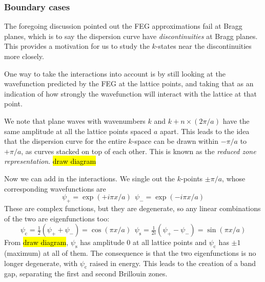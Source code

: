 \subsubsection{Boundary cases}
The foregoing discussion pointed out the FEG approximations fail at Bragg planes, which is to say the dispersion curve have \emph{discontinuities} at Bragg planes. This provides a motivation for us to study the $k$-states near the discontinuities more closely.\par
One way to take the interactions into account is by still looking at the wavefunction predicted by the FEG at the lattice points, and taking that as an indication of how strongly the wavefunction will interact with the lattice at that point.\par
We note that plane waves with wavenumbers $k$ and $k+n\times(2\pi/a)$ have the same amplitude at all the lattice points spaced $a$ apart. This leads to the idea that the dispersion curve for the entire $k$-space can be drawn within $-\pi/a$ to $+\pi/a$, as curves stacked on top of each other. This is known as the \emph{reduced zone representation}. \hl{draw diagram}\par
Now we can add in the interactions. We single out the $k$-points $\pm\pi/a$, whose corresponding wavefunctions are
\begin{equation}
	\psi_+=\exp(+i\pi x/a)\ \ \psi_-=\exp(-i\pi x/a)
\end{equation}
These are complex functions, but they are degenerate, so any linear combinations of the two are eigenfunctions too:
\begin{equation}
	\psi_{\mathrm{c}}=\tfrac{1}{2}(\psi_++\psi_-)=\cos(\pi x/a)\ \ \psi_{\mathrm{s}}=\tfrac{1}{2i}(\psi_+-\psi_-)=\sin(\pi x/a)
\end{equation}
From \hl{draw diagram}, $\psi_{\mathrm{s}}$ has amplitude 0 at all lattice points and $\psi_{\mathrm{c}}$ has $\pm1$ (maximum) at all of them. The consequence is that the two eigenfunctions is no longer degenerate, with $\psi_{\mathrm{c}}$ raised in energy. This leads to the creation of a band gap, separating the first and second Brillouin zones.
